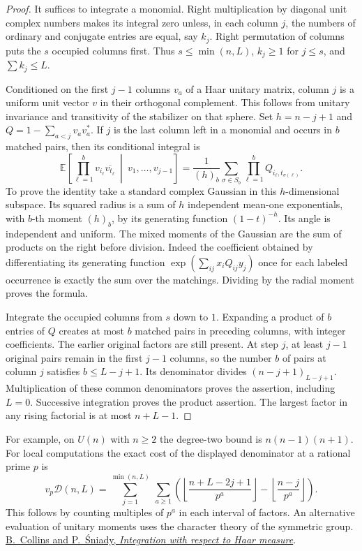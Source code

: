 \documentclass[a4paper,11pt]{article}
\theoremstyle{definition}
\theoremstyle{remark}
\numberwithin{equation}{section}
\begin{document}
\begin{proof}
It suffices to integrate a monomial. Right multiplication by
diagonal unit complex numbers makes its integral zero unless, in
each column \(j\), the numbers of ordinary and conjugate entries
are equal, say \(k_j\). Right permutation of columns puts the
\(s\) occupied columns first. Thus \(s\le\min(n,L)\),
\(k_j\ge1\) for \(j\le s\), and \(\sum k_j\le L\).

Conditioned on the first \(j-1\) columns \(v_a\) of a Haar
unitary matrix, column \(j\) is a uniform unit vector \(v\)
in their orthogonal complement. This follows from unitary
invariance and transitivity of the stabilizer on that sphere.
Set \(h=n-j+1\) and \(Q=1-\sum_{a<j}v_a v_a^*\). If \(j\)
is the last column left in a monomial and occurs in \(b\)
matched pairs, then its conditional integral is
\[
 \mathbb E\!\left[\prod_{\ell=1}^b v_{i_\ell}
           \overline{v_{t_\ell}}\ \middle|\ v_1,\ldots,v_{j-1}\right]
   =\frac{1}{(h)_b}\sum_{\sigma\in S_b}
                  \prod_{\ell=1}^b Q_{i_\ell,t_{\sigma(\ell)}}.
\]
To prove the identity take a standard complex Gaussian in this
\(h\)-dimensional subspace. Its squared radius is a sum of \(h\)
independent mean-one exponentials, with \(b\)-th moment
\((h)_b\), by its generating function \((1-t)^{-h}\).
Its angle is independent and uniform. The mixed moments of the
Gaussian are the sum of products on the right before division.
Indeed the coefficient obtained by differentiating its generating
function \(\exp(\sum_{ij}x_i Q_{ij} y_j)\) once for each
labeled occurrence is exactly the sum over the matchings.
Dividing by the radial moment proves the formula.

Integrate the occupied columns from \(s\) down to \(1\).
Expanding a product of \(b\) entries of \(Q\) creates at most
\(b\) matched pairs in preceding columns, with integer
coefficients. The earlier original factors are still present.
At step \(j\), at least \(j-1\) original pairs remain in the
first \(j-1\) columns, so the number \(b\) of pairs at column
\(j\) satisfies \(b\le L-j+1\). Its denominator divides
\((n-j+1)_{L-j+1}\). Multiplication of these common
denominators proves the assertion, including \(L=0\).
Successive integration proves the product assertion. The
largest factor in any rising factorial is at most \(n+L-1\).
\end{proof}

For example, on \(U(n)\) with \(n\ge2\) the degree-two bound is
\(n(n-1)(n+1)\). For local computations the exact cost of the
displayed denominator at a rational prime \(p\) is
\[
 v_p\mathcal D(n,L)=\sum_{j=1}^{\min(n,L)}\ \sum_{a\ge1}
 \left(\left\lfloor\frac{n+L-2j+1}{p^a}\right\rfloor
             -\left\lfloor\frac{n-j}{p^a}\right\rfloor\right).
\]
This follows by counting multiples of \(p^a\) in each interval
of factors. An alternative evaluation of unitary moments uses
the character theory of the symmetric group.
\href{https://arxiv.org/abs/math-ph/0402073}{B.~Collins and
P.~\'Sniady, \emph{Integration with respect to Haar measure}}.
\end{document}
